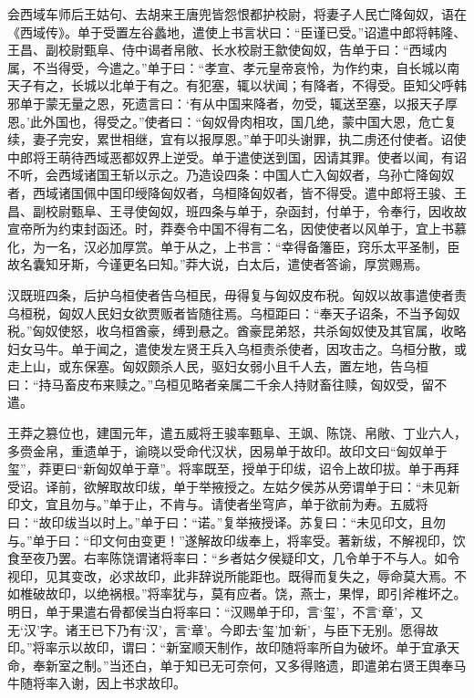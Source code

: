 \documentclass[12pt,UTF8]{ctexbook}
\begin{document}
会西域车师后王姑句、去胡来王唐兜皆怨恨都护校尉，将妻子人民亡降匈奴，语在《西域传》。单于受置左谷蠡地，遣使上书言状曰：“臣谨已受。”诏遣中郎将韩隆、王昌、副校尉甄阜、侍中谒者帛敞、长水校尉王歙使匈奴，告单于曰：“西域内属，不当得受，今遣之。”单于曰：“孝宣、孝元皇帝哀怜，为作约束，自长城以南天子有之，长城以北单于有之。有犯塞，辄以状闻；有降者，不得受。臣知父呼韩邪单于蒙无量之恩，死遗言曰：‘有从中国来降者，勿受，辄送至塞，以报天子厚恩。’此外国也，得受之。”使者曰：“匈奴骨肉相攻，国几绝，蒙中国大恩，危亡复续，妻子完安，累世相继，宜有以报厚恩。”单于叩头谢罪，执二虏还付使者。诏使中郎将王萌待西域恶都奴界上逆受。单于遣使送到国，因请其罪。使者以闻，有诏不听，会西域诸国王斩以示之。乃造设四条：中国人亡入匈奴者，乌孙亡降匈奴者，西域诸国佩中国印绶降匈奴者，乌桓降匈奴者，皆不得受。遣中郎将王骏、王昌、副校尉甄阜、王寻使匈奴，班四条与单于，杂函封，付单于，令奉行，因收故宣帝所为约束封函还。时，莽奏令中国不得有二名，因使使者以风单于，宜上书慕化，为一名，汉必加厚赏。单于从之，上书言：“幸得备籓臣，窍乐太平圣制，臣故名囊知牙斯，今谨更名曰知。”莽大说，白太后，遣使者答谕，厚赏赐焉。



汉既班四条，后护乌桓使者告乌桓民，毋得复与匈奴皮布税。匈奴以故事遣使者责乌桓税，匈奴人民妇女欲贾贩者皆随往焉。乌桓距曰：“奉天子诏条，不当予匈奴税。”匈奴使怒，收乌桓酋豪，缚到悬之。酋豪昆弟怒，共杀匈奴使及其官属，收略妇女马牛。单于闻之，遣使发左贤王兵入乌桓责杀使者，因攻击之。乌桓分散，或走上山，或东保塞。匈奴颇杀人民，驱妇女弱小且千人去，置左地，告乌桓曰：“持马畜皮布来赎之。”乌桓见略者亲属二千余人持财畜往赎，匈奴受，留不遣。



王莽之篡位也，建国元年，遣五威将王骏率甄阜、王飒、陈饶、帛敞、丁业六人，多赍金帛，重遗单于，谕晓以受命代汉状，因易单于故印。故印文曰“匈奴单于玺”，莽更曰“新匈奴单于章”。将率既至，授单于印绂，诏令上故印拔。单于再拜受诏。译前，欲解取故印绂，单于举掖授之。左姑夕侯苏从旁谓单于曰：“未见新印文，宜且勿与。”单于止，不肯与。请使者坐穹庐，单于欲前为寿。五威将曰：“故印绂当以时上。”单于曰：“诺。”复举掖授译。苏复曰：“未见印文，且勿与。”单于曰：“印文何由变更！”遂解故印绂奉上，将率受。著新绂，不解视印，饮食至夜乃罢。右率陈饶谓诸将率曰：“乡者姑夕侯疑印文，几令单于不与人。如令视印，见其变改，必求故印，此非辞说所能距也。既得而复失之，辱命莫大焉。不如椎破故印，以绝祸根。”将率犹与，莫有应者。饶，燕士，果悍，即引斧椎坏之。明日，单于果遣右骨都侯当白将率曰：“汉赐单于印，言‘玺’，不言‘章’，又无‘汉’字。诸王已下乃有‘汉’，言‘章’。今即去‘玺’加‘新’，与臣下无别。愿得故印。”将率示以故印，谓曰：“新室顺天制作，故印随将率所自为破坏。单于宜承天命，奉新室之制。”当还白，单于知已无可奈何，又多得赂遗，即遣弟右贤王舆奉马牛随将率入谢，因上书求故印。
\end{document}
